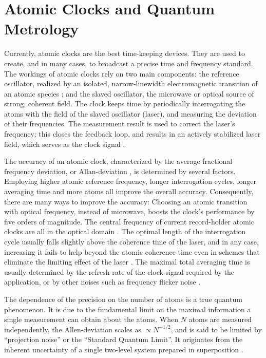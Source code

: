 \section{Atomic Clocks and Quantum Metrology}
Currently, atomic clocks are the best time-keeping devices. They are
used to create, and in many cases, to broadcast a precise time and
frequency standard. The workings of atomic clocks rely on two main components: the
reference oscillator, realized by an isolated, narrow-linewidth electromagnetic
transition of an atomic species \cite{Derevianko2011}; and the slaved
oscillator, the microwave or optical source of strong, coherent field. The
clock keeps time by periodically interrogating the atoms with the field of the
slaved oscillator (laser), and measuring the deviation of their frequencies.
The measurement result is used to correct the laser's frequency; this
closes the feedback loop, and results in an actively stabilized laser field,
which serves as the clock signal \cite{Diddams2004}.

The accuracy of an atomic clock, characterized by the average fractional
frequency deviation, or Allan-deviation \cite{Allan1966, Rutman1978}, is
determined by several factors. Employing higher atomic reference frequency,
longer interrogation cycles, longer averaging time and more atoms all improve
the overall accuracy. Consequently, there are many ways to improve the accuracy:
Choosing an atomic transition with optical frequency, instead of microwave,
boosts the clock's performance by five orders of magnitude. The central
frequency of current record-holder atomic clocks are all in the optical domain
\cite{Ludlow2015}. The optimal length of the interrogation cycle usually falls
slightly above the coherence time of the laser, and in any case, increasing it
fails to help beyond the atomic coherence time even in schemes that eliminate
the limiting effect of the laser \cite{Borregaard2013, Rosenband2013}. The
maximal total averaging time is usually determined by the refresh rate of the
clock signal required by the application, or by other noises such as frequency
flicker noise \cite{Barnes1966}.

The dependence of the precision on the number of atoms is a true quantum
phenomenon.
It is due to the fundamental limit on the maximal information a single
measurement can obtain about the atoms. When $N$ atoms are measured
independently, the Allen-deviation scales as $\propto N^{-1/2}$, and is said to
be limited by ``projection noise'' or the ``Standard Quantum Limit''. It
originates from the inherent uncertainty of a single
two-level system prepared in superposition \cite{Santarelli1998}.
 
